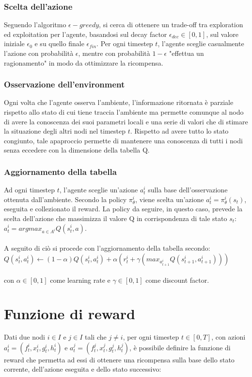 \documentclass{article}
\begin{document}
{\subsubsection{Scelta dell'azione}
Seguendo l'algoritmo $\epsilon-greedy$, si cerca di ottenere un trade-off tra exploration ed exploitation per l'agente, basandosi sul decay factor $\epsilon_{dec} \in[0, 1]$, sul valore iniziale $\epsilon_0$ e su quello finale $\epsilon_{fin}$. Per ogni timestep $t$, l'agente sceglie casualmente l'azione con probabilità $\epsilon$, mentre con probabilità $1 - \epsilon$ "effettua un ragionamento" in modo da ottimizzare la ricompensa.

\subsubsection{Osservazione dell'environment}
Ogni volta che l'agente osserva l'ambiente, l'informazione ritornata è parziale rispetto allo stato di cui tiene traccia l'ambiente ma permette comunque al nodo di avere la conoscenza dei suoi parametri locali e una serie di valori che di stimare la situazione degli altri nodi nel timestep $t$. Rispetto ad avere tutto lo stato congiunto, tale apaproccio permette di mantenere una conoscenza di tutti i nodi senza eccedere con la dimensione della tabella Q.

\subsubsection{Aggiornamento della tabella}
Ad ogni timestep $t$, l'agente sceglie un'azione $a_t^i$ sulla base dell'osservazione ottenuta dall'ambiente. Secondo la policy $\pi_{\theta}^i$, viene scelta un'azione $a_t^i = \pi_\theta^i(s_t)$, eseguita e collezionato il reward. La policy da seguire, in questo caso, prevede la scelta  dell'azione che massimizza il valore Q in corrispondenza di tale stato $s_t$: $a_t^i = argmax_{a \in A^i} Q(s_t^i, a)$.\\\\ A seguito di ciò si procede con l'aggiornamento della tabella secondo:\\

$Q(s_t^i, a_t^i) \leftarrow (1-\alpha)Q(s_t^i, a_t^i) + \alpha(r_t^i + \gamma(max_{a_{t+1}^i} Q(s_{t+1}^i, a_{t+1}^i)))$ \\\\
con $\alpha \in [0, 1]$ come learning rate e $\gamma \in [0, 1]$ come discount factor. 


\section{Funzione di reward}
Dati due nodi $i \in I$ e $j \in I$ tali che $j \neq i$, per ogni timestep $t \in [0, T]$, con azioni $a_t^i = (f_t^i, x_t^i, g_t^i, h_t^i)$ e $a_t^j = (f_t^j, x_t^j, g_t^j, h_t^j)$, è possibile definire la funzione di reward che permetta ad essi di ottenere una ricompensa sulla base dello stato corrente, dell'azione eseguita e dello stato successivo:\\

}
\end{document}
